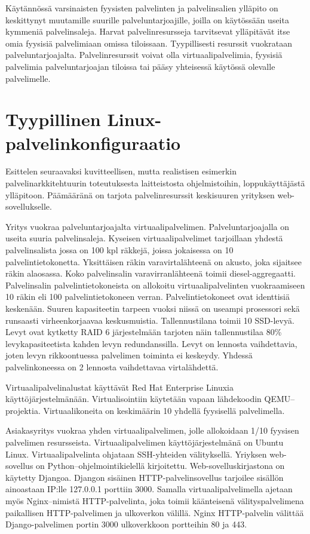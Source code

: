 Käytännössä varsinaisten fyysisten palvelinten ja palvelinsalien ylläpito on keskittynyt muutamille suurille palveluntarjoajille, joilla on käytössään useita kymmeniä palvelinsaleja. Harvat palvelinresursseja tarvitsevat ylläpitävät itse omia fyysisiä palvelimiaan omissa tiloissaan. Tyypillisesti resurssit vuokrataan palveluntarjoajalta. Palvelinresurssit voivat olla virtuaalipalvelimia, fyysisiä palvelimia palveluntarjoajan tiloissa tai pääsy yhteisessä käytössä olevalle palvelimelle.~\cite{portnoy2016virtualization}

\section{Tyypillinen Linux-palvelinkonfiguraatio}\label{tyypillinen_palvelinkonfiguraatio}

    Esittelen seuraavaksi kuvitteellisen, mutta realistisen esimerkin palvelinarkkitehtuurin toteutuksesta laitteistosta ohjelmistoihin, loppukäyttäjästä ylläpitoon. Päämääränä on tarjota palvelinresurssit keskisuuren yrityksen web-sovellukselle.

    Yritys vuokraa palveluntarjoajalta virtuaalipalvelimen. Palveluntarjoajalla on useita suuria palvelinsaleja. Kyseisen virtuaalipalvelimet tarjoillaan yhdestä palvelinsalista jossa on 100 kpl räkkejä, joissa jokaisessa on 10 palvelintietokonetta. Yksittäisen räkin varavirtalähteenä on akusto, joka sijaitsee räkin alaosassa. Koko palvelinsalin varavirranlähteenä toimii diesel-aggregaatti. Palvelinsalin palvelintietokoneista on allokoitu virtuaalipalvelinten vuokraamiseen 10 räkin eli 100 palvelintietokoneen verran. Palvelintietokoneet ovat identtisiä keskenään. Suuren kapasiteetin tarpeen vuoksi niissä on useampi prosessori sekä runsaasti virheenkorjaavaa keskusmuistia. Tallennustilana toimii 10 SSD-levyä. Levyt ovat kytketty RAID 6 järjestelmään tarjoten näin tallennustilaa 80\% levykapasiteetista kahden levyn redundanssilla. Levyt on lennosta vaihdettavia, joten levyn rikkoontuessa palvelimen toiminta ei keskeydy. Yhdessä palvelinkoneessa on 2 lennosta vaihdettavaa virtalähdettä.

    Virtuaalipalvelinalustat käyttävät Red Hat Enterprise Linuxia käyttöjärjestelmänään. Virtualisointiin käytetään vapaan lähdekoodin QEMU–projektia. Virtuaalikoneita on keskimäärin 10 yhdellä fyysisellä palvelimella.

    Asiakasyritys vuokraa yhden virtuaalipalvelimen, jolle allokoidaan 1/10 fyysisen palvelimen resursseista. Virtuaalipalvelimen käyttöjärjestelmänä on Ubuntu Linux. Virtuaalipalvelinta ohjataan SSH-yhteiden välityksellä. Yriyksen web-sovellus on Python–ohjelmointikielellä kirjoitettu. Web-sovelluskirjastona on käytetty Djangoa. Djangon sisäinen HTTP-palvelinsovellus tarjoilee sisällön ainoastaan IP:lle 127.0.0.1 porttiin 3000. Samalla virtuaalipalvelimella ajetaan myös Nginx–nimistä HTTP-palvelinta, joka toimii käänteisenä välityspalvelimena paikallisen HTTP-palvelimen ja ulkoverkon välillä. Nginx HTTP-palvelin välittää Django-palvelimen portin 3000 ulkoverkkoon portteihin 80 ja 443.

